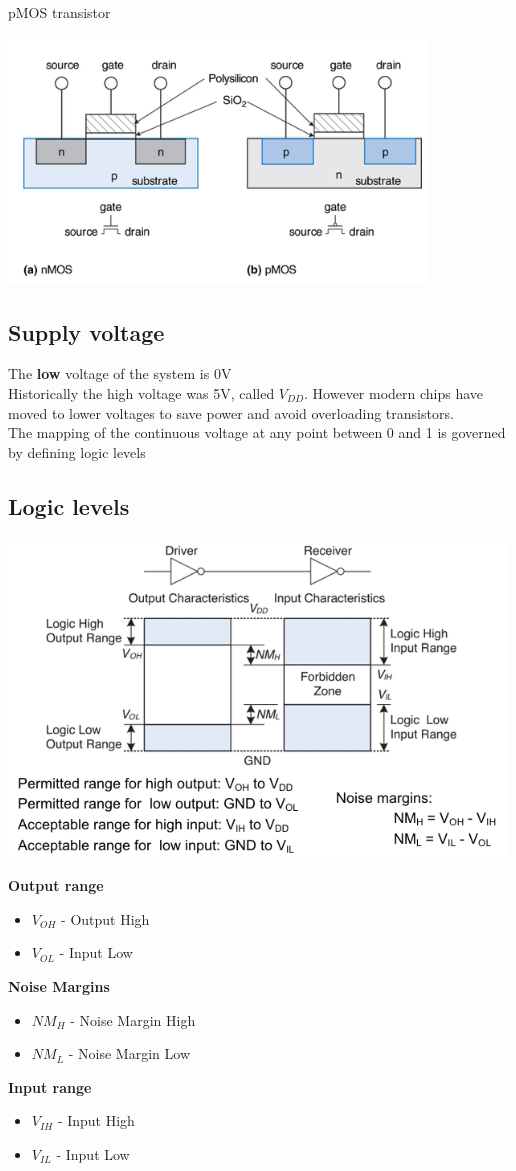 \documentclass{article}[18pt]
\begin{document}
pMOS transistor
\begin{center}
	\includegraphics[scale=0.7]{pMOS}
\end{center}
\subsection{Supply voltage}
The \textbf{low} voltage of the system is 0V\\
Historically the high voltage was 5V, called $V_{DD}$. However modern chips have moved to lower voltages to save power and avoid overloading transistors.\\
The mapping of the continuous voltage at any point between 0 and 1 is governed by defining logic levels
\subsection{Logic levels}
\begin{center}
	\includegraphics[scale=0.7]{"Logic Levels"}
\end{center}
\textbf{Output range}
\begin{itemize}
	\item $V_{OH}$ - Output High
	\item $V_{OL}$ - Input Low
\end{itemize}
\textbf{Noise Margins}
\begin{itemize}
	\item $NM_H$ - Noise Margin High
	\item $NM_L$ - Noise Margin Low
\end{itemize}
\textbf{Input range}
\begin{itemize}
	\item $V_{IH}$ - Input High
	\item $V_{IL}$ - Input Low
\end{itemize}
\end{document}
